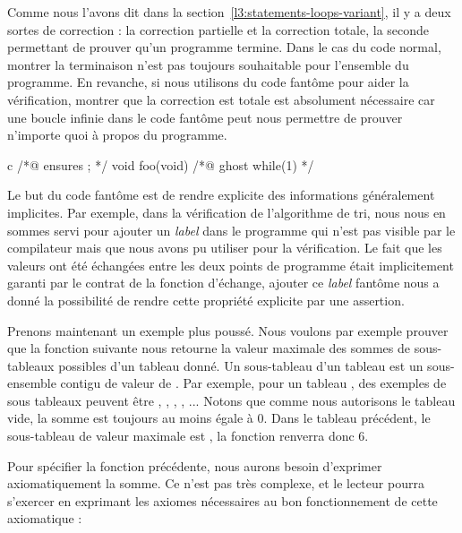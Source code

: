 Comme nous l'avons dit dans la section~\ref{l3:statements-loops-variant}, il y
a deux sortes de correction : la correction partielle et la correction totale,
la seconde permettant de prouver qu'un programme termine. Dans le cas du code
normal, montrer la terminaison n'est pas toujours souhaitable pour l'ensemble
du programme. En revanche, si nous utilisons du code fantôme pour aider la
vérification, montrer que la correction est totale est absolument nécessaire
car une boucle infinie dans le code fantôme peut nous permettre de prouver
n'importe quoi à propos du programme.


\begin{CodeBlock}{c}
/*@ ensures \false ; */
void foo(void){
  /*@ ghost
    while(1){}
  */
}
\end{CodeBlock}




Le but du code fantôme est de rendre explicite des informations généralement
implicites. Par exemple, dans la vérification de l'algorithme de tri, nous nous en
sommes servi pour ajouter un \textit{label} dans le programme qui n'est pas
visible par le compilateur mais que nous avons pu utiliser pour la vérification.
Le fait que les valeurs ont été échangées entre les deux points de programme était
implicitement garanti par le contrat de la fonction d'échange, ajouter ce
\textit{label} fantôme nous a donné la possibilité de rendre cette propriété
explicite par une assertion.



Prenons maintenant un exemple plus poussé. Nous voulons par exemple prouver que
la fonction suivante nous retourne la valeur maximale des sommes de sous-tableaux
possibles d'un tableau donné. Un sous-tableau d'un tableau  est un
sous-ensemble contigu de valeur de . Par exemple, pour un tableau
, des exemples de sous tableaux peuvent être
\CodeInline{\{\}}, , ,
, ... Notons que comme nous autorisons le
tableau vide, la somme est toujours au moins égale à 0. Dans le tableau précédent,
le sous-tableau de valeur maximale est , la fonction
renverra donc 6.






Pour spécifier la fonction précédente, nous aurons besoin d'exprimer
axiomatiquement la somme. Ce n'est pas très complexe, et le lecteur pourra
s'exercer en exprimant les axiomes nécessaires au bon fonctionnement de cette
axiomatique :



